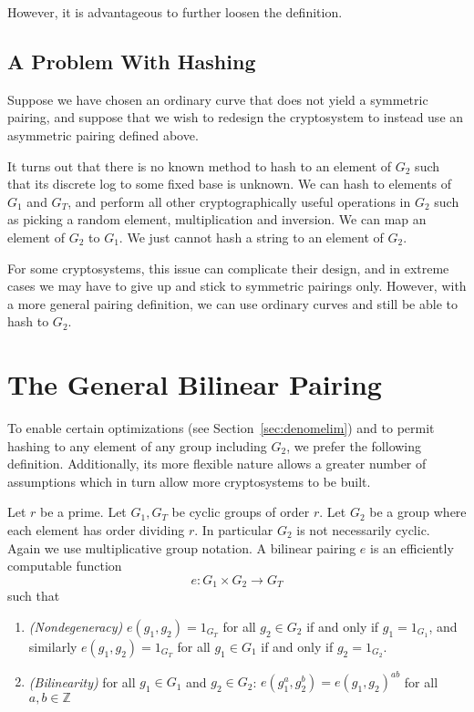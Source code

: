 However, it is advantageous to further loosen the
definition.

\subsection{A Problem With Hashing}

Suppose we have chosen an ordinary curve that does not yield a symmetric
pairing, and suppose that we wish to redesign
the cryptosystem to instead use an asymmetric pairing defined above.

It turns out that there is no
known method to hash to an element of $G_2$ such that
its discrete log to some fixed base is unknown. We can hash to elements of
$G_1$ and $G_T$, and perform all other cryptographically useful
operations in $G_2$ such as picking a random element, multiplication
and inversion. We can map an element of $G_2$ to $G_1$.
We just cannot hash a string to an element of $G_2$.

For some cryptosystems, this issue can complicate their design,
and in extreme cases we may have to give up and stick to symmetric pairings
only.
However, with a more general pairing definition, we can use ordinary curves
and still be able to hash to $G_2$.

\section{\label{sec:generalpairing}The General Bilinear Pairing}

To enable certain optimizations (see Section~\ref{sec:denomelim}) and
to permit hashing to any element of any group including $G_2$,
we prefer the following definition. Additionally, its more flexible nature
allows a greater number of assumptions which in turn allow more
cryptosystems to be built.

Let $r$ be a prime.
Let $G_1, G_T$ be cyclic groups of order $r$.
Let $G_2$ be a group where each element has order dividing $r$.
In particular $G_2$ is not necessarily cyclic.
Again we use multiplicative group notation.
A bilinear pairing $e$ is an efficiently computable function
\[
e:G_1 \times G_2 \rightarrow G_T
\]
such that
\begin{enumerate}
\item
\emph{(Nondegeneracy)}
$e(g_1,g_2) = 1_{G_T}$ for all $g_2 \in G_2$ if and only if $g_1 = 1_{G_1}$,
and similarly 
$e(g_1,g_2) = 1_{G_T}$ for all $g_1 \in G_1$ if and only if $g_2 = 1_{G_2}$.
\item
\emph{(Bilinearity)}
for all $g_1 \in G_1$ and $g_2 \in G_2$:
$e(g_1^a, g_2^b) = e(g_1,g_2)^{a b}$ for all $a, b \in \mathbb{Z}$
\end{enumerate}

